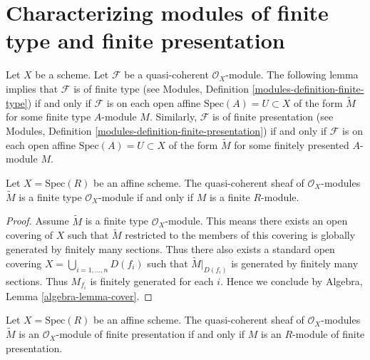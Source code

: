 \section{Characterizing modules of finite type and finite presentation}
\label{section-characterizing-finite-type-presentation}

\noindent
Let $X$ be a scheme.
Let $\mathcal{F}$ be a quasi-coherent $\mathcal{O}_X$-module.
The following lemma implies that $\mathcal{F}$ is of finite type
(see Modules, Definition \ref{modules-definition-finite-type})
if and only if $\mathcal{F}$ is
on each open affine $\text{Spec}(A) = U \subset X$
of the form $\widetilde M$ for some finite type $A$-module $M$.
Similarly, $\mathcal{F}$ is of finite presentation
(see Modules, Definition \ref{modules-definition-finite-presentation})
if and only if $\mathcal{F}$ is
on each open affine $\text{Spec}(A) = U \subset X$
of the form $\widetilde M$ for some finitely presented $A$-module $M$.

\begin{lemma}
\label{lemma-finite-type-module}
Let $X = \text{Spec}(R)$ be an affine scheme.
The quasi-coherent sheaf of $\mathcal{O}_X$-modules
$\widetilde M$ is a finite type $\mathcal{O}_X$-module
if and only if $M$ is a finite $R$-module.
\end{lemma}

\begin{proof}
Assume $\widetilde M$ is a finite type $\mathcal{O}_X$-module.
This means there exists an open covering of $X$ such that
$\widetilde M$ restricted to the members of this covering is
globally generated by finitely many sections.
Thus there also exists a standard open covering
$X = \bigcup_{i = 1, \ldots, n} D(f_i)$ such that $\widetilde M|_{D(f_i)}$
is generated by finitely many sections. Thus $M_{f_i}$ is finitely
generated for each $i$. Hence we conclude by
Algebra, Lemma \ref{algebra-lemma-cover}.
\end{proof}

\begin{lemma}
\label{lemma-finite-presentation-module}
Let $X = \text{Spec}(R)$ be an affine scheme. The quasi-coherent sheaf
of $\mathcal{O}_X$-modules $\widetilde M$ is an $\mathcal{O}_X$-module of
finite presentation if and only if $M$ is an $R$-module of finite presentation.
\end{lemma}

